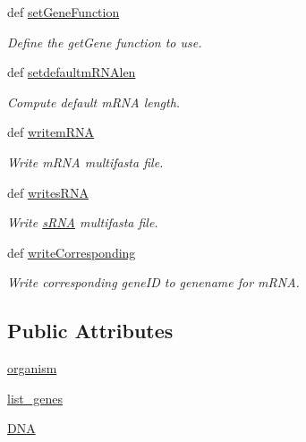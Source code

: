 \begin{DoxyCompactItemize}
def \hyperlink{classirna_1_1iRNA__seq_1_1Sequences_1_1Sequences_abbd64ccaeece0f11ec793cdc65c82d9d}{set\-Gene\-Function}
\begin{DoxyCompactList}\small\item\em \-Define the get\-Gene function to use. \end{DoxyCompactList}\item 
def \hyperlink{classirna_1_1iRNA__seq_1_1Sequences_1_1Sequences_a969137d0ba4936c838aae40bd10234eb}{setdefaultm\-R\-N\-Alen}
\begin{DoxyCompactList}\small\item\em \-Compute default m\-R\-N\-A length. \end{DoxyCompactList}\item 
def \hyperlink{classirna_1_1iRNA__seq_1_1Sequences_1_1Sequences_a1ac06711ef743e34d649c2a12054e6e2}{writem\-R\-N\-A}
\begin{DoxyCompactList}\small\item\em \-Write m\-R\-N\-A multifasta file. \end{DoxyCompactList}\item 
def \hyperlink{classirna_1_1iRNA__seq_1_1Sequences_1_1Sequences_ad1e1d69ab10b705471f71afa1f720753}{writes\-R\-N\-A}
\begin{DoxyCompactList}\small\item\em \-Write \hyperlink{namespaceirna_1_1iRNA__seq_1_1sRNA}{s\-R\-N\-A} multifasta file. \end{DoxyCompactList}\item 
def \hyperlink{classirna_1_1iRNA__seq_1_1Sequences_1_1Sequences_afcff164f65cdaaeda77a0464448a57a4}{write\-Corresponding}
\begin{DoxyCompactList}\small\item\em \-Write corresponding gene\-I\-D to genename for m\-R\-N\-A. \end{DoxyCompactList}\end{DoxyCompactItemize}
\subsection*{\-Public \-Attributes}
\begin{DoxyCompactItemize}
\item 
\hyperlink{classirna_1_1iRNA__seq_1_1Sequences_1_1Sequences_a078ccc0283cf8832c2b6162c0e31ccc7}{organism}
\item 
\hyperlink{classirna_1_1iRNA__seq_1_1Sequences_1_1Sequences_a98bf038d1355cf769421d59fd5d33dc2}{list\-\_\-genes}
\item 
\hyperlink{classirna_1_1iRNA__seq_1_1Sequences_1_1Sequences_a2545c4d405f3fe4769e2d571779ca672}{\-D\-N\-A}
\end{DoxyCompactItemize}


